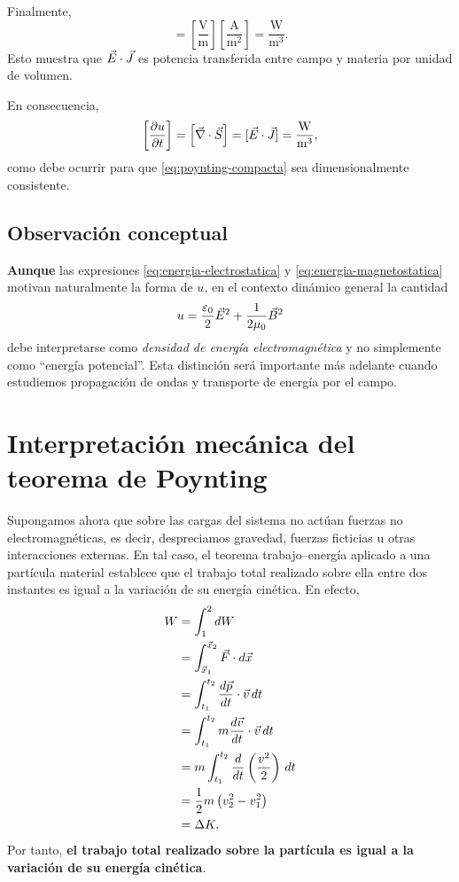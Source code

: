 \documentclass[../main.tex]{subfiles}
\begin{document}
Finalmente,
\begin{equation*}
    [\E\cdot\J]
    =
    \left[\frac{\mathrm{V}}{\mathrm{m}}\right]
    \left[\frac{\mathrm{A}}{\mathrm{m}^2}\right]
    =
    \frac{\mathrm{W}}{\mathrm{m}^3}.
\end{equation*}
Esto muestra que $\vec{E}\cdot\vec{J}$ es potencia transferida entre campo y materia por unidad de volumen.

En consecuencia,
\begin{equation*}
    \left[\frac{\partial u}{\partial t}\right]
    =
    \left[\vec\nabla\cdot\vec S\right]
    =
    [\vec{E}\cdot\vec{J}]
    =
    \frac{\mathrm{W}}{\mathrm{m}^3},
\end{equation*}
como debe ocurrir para que \eqref{eq:poynting-compacta} sea dimensionalmente consistente.

\subsection*{Observación conceptual}

\textbf{Aunque} las expresiones \eqref{eq:energia-electrostatica} y \eqref{eq:energia-magnetostatica} motivan naturalmente la forma de $u$, en el contexto dinámico general la cantidad
\begin{equation*}
    u=\frac{\varepsilon_0}{2}\vec{E}^2+\frac{1}{2\mu_0}\vec{B}^2
\end{equation*}
debe interpretarse como \emph{densidad de energía electromagnética} y no simplemente como ``energía potencial''. Esta distinción será importante más adelante cuando estudiemos propagación de ondas y transporte de energía por el campo.


\section{Interpretación mecánica del teorema de Poynting}

Supongamos ahora que sobre las cargas del sistema no actúan fuerzas no electromagnéticas, es decir, despreciamos gravedad, fuerzas ficticias u otras interacciones externas. En tal caso, el teorema trabajo--energía aplicado a una partícula material establece que el trabajo total realizado sobre ella entre dos instantes es igual a la variación de su energía cinética. En efecto,
\begin{align*}
    W
    &=\int_1^2 dW \notag\\
    &=\int_{\vec x_1}^{\vec x_2}\vec F\cdot d\vec x \notag\\
    &=\int_{t_1}^{t_2}\frac{d\vec p}{dt}\cdot\vec v\,dt \notag\\
    &=\int_{t_1}^{t_2}m\frac{d\vec v}{dt}\cdot\vec v\,dt \notag\\
    &=m\int_{t_1}^{t_2}\frac{d}{dt}\left(\frac{v^2}{2}\right)\,dt \notag\\
    &=\frac{1}{2}m\left(v_2^2-v_1^2\right) \notag\\
    &=\Delta K.
\end{align*}
Por tanto, \textbf{el trabajo total realizado sobre la partícula es igual a la variación de su energía cinética}.
\end{document}
